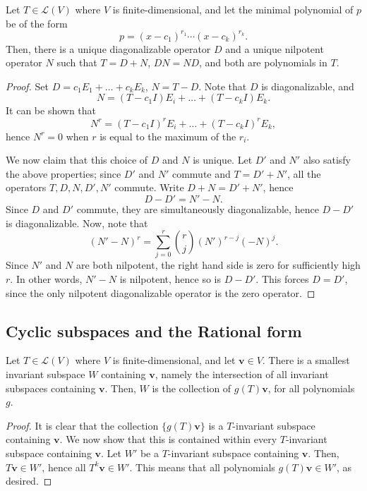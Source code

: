 \documentclass[11pt]{article}
\renewcommand{\vec}[1]{\boldsymbol{#1}}
\newcommand{\vv}{\vec{v}}
\newcommand{\alg}[1]{\mathscr{#1}}
\newcommand{\algL}{\alg{L}}
\theoremstyle{definition}
\theoremstyle{remark}
\numberwithin{equation}{section}
\begin{document}
    \begin{theorem}
        Let $T \in \algL(V)$ where $V$ is finite-dimensional, and let the minimal
        polynomial of $p$ be of the form \[
            p = (x - c_1)^{r_1} \cdots (x - c_k)^{r_k}.
        \] Then, there is a unique diagonalizable operator $D$ and a unique nilpotent
        operator $N$ such that $T = D + N$, $DN = ND$, and both are polynomials in
        $T$.
    \end{theorem}
    \begin{proof}
        Set $D = c_1E_1 + \dots + c_kE_k$, $N = T - D$. Note that $D$ is
        diagonalizable, and \[
            N = (T - c_1I)E_i + \dots + (T - c_kI)E_k.
        \] It can be shown that \[
            N^r = (T - c_1I)^rE_i + \dots + (T - c_kI)^rE_k,
        \] hence $N^r = 0$ when $r$ is equal to the maximum of the $r_i$.

        We now claim that this choice of $D$ and $N$ is unique. Let $D'$ and $N'$
        also satisfy the above properties; since $D'$ and $N'$ commute and $T = D' +
        N'$, all the operators $T, D, N, D', N'$ commute. Write $D + N = D' + N'$,
        hence \[
            D - D' = N' - N.
        \] Since $D$ and $D'$ commute, they are simultaneously diagonalizable, hence
        $D - D'$ is diagonalizable. Now, note that \[
            (N' - N)^r = \sum_{j = 0}^r \binom{r}{j} (N')^{r - j}(-N)^{j}.
        \] Since $N'$ and $N$ are both nilpotent, the right hand side is zero for
        sufficiently high $r$. In other words, $N' - N$ is nilpotent, hence so is $D
        - D'$. This forces $D = D'$, since the only nilpotent diagonalizable operator
        is the zero operator.
    \end{proof}

    \subsection{Cyclic subspaces and the Rational form}
    \begin{lemma}
        Let $T \in \algL(V)$ where $V$ is finite-dimensional, and let $\vv \in V$.
        There is a smallest invariant subspace $W$ containing $\vv$, namely the
        intersection of all invariant subspaces containing $\vv$. Then, $W$ is the
        collection of $g(T)\vv$, for all polynomials $g$.
    \end{lemma}
    \begin{proof}
        It is clear that the collection $\{g(T) \vv\}$ is a $T$-invariant
        subspace containing $\vv$. We now show that this is contained within every
        $T$-invariant subspace containing $\vv$. Let $W'$ be a $T$-invariant subspace
        containing $\vv$. Then, $T\vv \in W'$, hence all $T^k\vv \in W'$. This means
        that all polynomials $g(T)\vv \in W'$, as desired.
    \end{proof}
\end{document}
